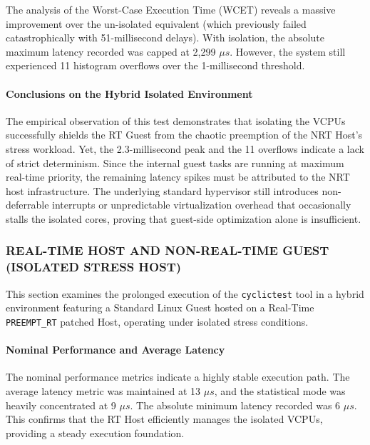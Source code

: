 The analysis of the Worst-Case Execution Time (WCET) reveals a massive
improvement over the un-isolated equivalent (which previously failed
catastrophically with 51-millisecond delays). With isolation, the
absolute maximum latency recorded was capped at 2,299 $\mu s$. However, the
system still experienced 11 histogram overflows over the 1-millisecond
threshold.

\paragraph{Conclusions on the Hybrid Isolated
Environment}\label{conclusions-on-the-hybrid-isolated-environment}

The empirical observation of this test demonstrates that isolating the
VCPUs successfully shields the RT Guest from the chaotic preemption of
the NRT Host's stress workload. Yet, the 2.3-millisecond peak and the 11
overflows indicate a lack of strict determinism. Since the internal
guest tasks are running at maximum real-time priority, the remaining
latency spikes must be attributed to the NRT host infrastructure. The
underlying standard hypervisor still introduces non-deferrable
interrupts or unpredictable virtualization overhead that occasionally
stalls the isolated cores, proving that guest-side optimization alone is
insufficient.

\subsubsection{REAL-TIME HOST AND NON-REAL-TIME GUEST (ISOLATED STRESS
HOST)}\label{real-time-host-and-non-real-time-guest-isolated-stress-host}

This section examines the prolonged execution of the \texttt{cyclictest}
tool in a hybrid environment featuring a Standard Linux Guest hosted on
a Real-Time \texttt{PREEMPT\_RT} patched Host, operating under isolated
stress conditions.

\paragraph{Nominal Performance and Average
Latency}\label{nominal-performance-and-average-latency-6}

The nominal performance metrics indicate a highly stable execution path.
The average latency metric was maintained at 13 $\mu s$, and the statistical
mode was heavily concentrated at 9 $\mu s$. The absolute minimum latency
recorded was 6 $\mu s$. This confirms that the RT Host efficiently manages
the isolated VCPUs, providing a steady execution foundation.

